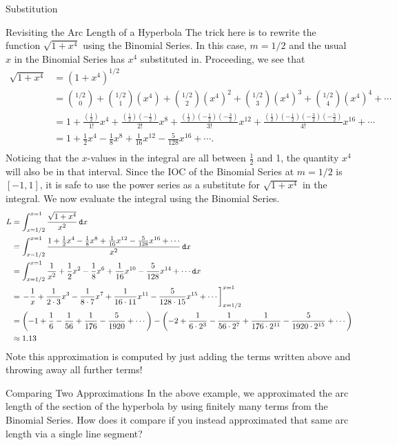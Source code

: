 \begin{subsection}{Substitution}
\begin{example}{Revisiting the Arc Length of a Hyperbola}
The trick here is to rewrite the function $\sqrt{1+x^4}$ using the Binomial Series.  In this case, $m=1/2$ and the usual $x$ in the Binomial Series has $x^4$ substituted in.  Proceeding, we see that \begin{align*}
\sqrt{1+x^4}&=\left(1+x^4\right)^{1/2}\\
&=\binom{1/2}{0}+\binom{1/2}{1}\left(x^4\right)+\binom{1/2}{2}\left(x^4\right)^2+\binom{1/2}{3}\left(x^4\right)^3+\binom{1/2}{4}\left(x^4\right)^4+\cdots \\
&=1+\frac{\left(\frac{1}{2}\right)}{1!}x^4+\frac{\left(\frac{1}{2}\right)\left(-\frac{1}{2}\right)}{2!}x^8+\frac{\left(\frac{1}{2}\right)\left(-\frac{1}{2}\right)\left(-\frac{3}{2}\right)}{3!}x^{12}+\frac{\left(\frac{1}{2}\right)\left(-\frac{1}{2}\right)\left(-\frac{3}{2}\right)\left(-\frac{5}{2}\right)}{4!}x^{16}+\cdots \\
&=1+\frac{1}{2}x^4-\frac{1}{8}x^8+\frac{1}{16}x^{12}-\frac{5}{128}x^{16}+\cdots. \\
\end{align*}
Noticing that the $x$-values in the integral are all between $\frac{1}{2}$ and 1, the quantity $x^4$ will also be in that interval.  Since the IOC of the Binomial Series at $m=1/2$ is $[-1,1]$, it is safe to use the power series as a substitute for $\sqrt{1+x^4}$ in the integral.  We now evaluate the integral using the Binomial Series.
\begin{align*}
L&= \int_{x=1/2}^{x=1} \frac{\sqrt{1+x^4}}{x^2} \mathop{}\!\mathtt{d} x \\
&=\int_{x=1/2}^{x=1} \frac{1+\frac{1}{2}x^4-\frac{1}{8}x^8+\frac{1}{16}x^{12}-\frac{5}{128}x^{16}+\cdots}{x^2} \mathop{}\!\mathtt{d} x \\
&=\int_{x=1/2}^{x=1} \frac{1}{x^2}+\frac{1}{2}x^2-\frac{1}{8}x^6+\frac{1}{16}x^{10}-\frac{5}{128}x^{14}+\cdots \mathop{}\!\mathtt{d} x \\
&=\left. -\frac{1}{x}+\frac{1}{2\cdot 3}x^3-\frac{1}{8\cdot 7}x^7+\frac{1}{16\cdot 11}x^{11}-\frac{5}{128\cdot 15}x^{15}+\cdots\right]_{x=1/2}^{x=1}\\
 &=\left(-1+\frac{1}{6}-\frac{1}{56}+\frac{1}{176}-\frac{5}{1920}+\cdots\right)-\left(-2+\frac{1}{6\cdot 2^3}-\frac{1}{56\cdot 2^7}+\frac{1}{176\cdot 2^{11}}-\frac{5}{1920\cdot 2^{15}}+\cdots\right)\\
 &\approx 1.13
\end{align*}
Note this approximation is computed by just adding the terms written above and throwing away all further terms!  
\end{example}

\begin{exercise}{Comparing Two Approximations \Coffeecup}
In the above example, we approximated the arc length of the section of the hyperbola by using finitely many terms from the Binomial Series.  How does it compare if you instead approximated that same arc length via a single line segment?

\vspace*{1in}
\end{exercise}

\end{subsection}

